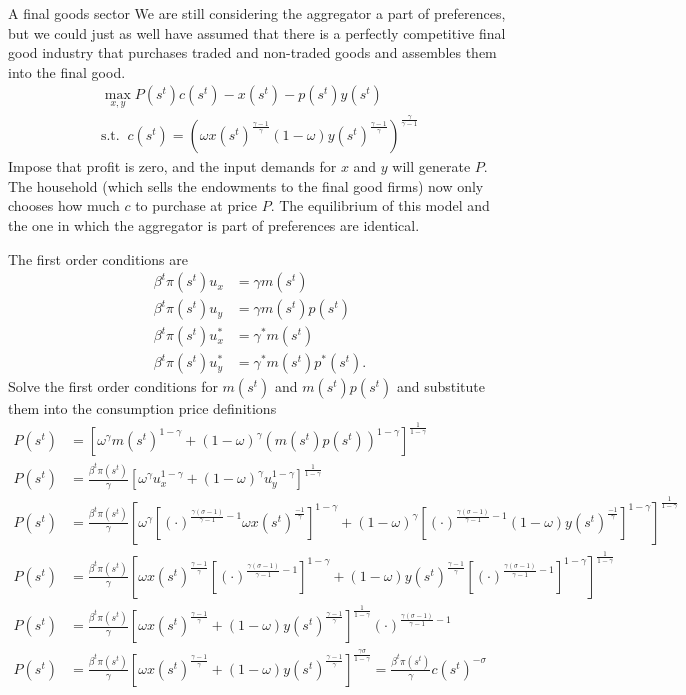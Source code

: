 \documentclass[11pt,pdftex,twoside,letterpaper]{exam}
\begin{document}
\begin{mybox}{A final goods sector}
We are still considering the aggregator a part of preferences, but we could just as well have assumed that there is a perfectly competitive final good industry that purchases traded and non-traded goods and assembles them into the final good.
\begin{align}
  \max_{x,y} P(s^t)c(s^t) - x(s^t) - p(s^t)y(s^t) \\
  \textrm{s.t.}\;\; c(s^t) = \left( \omega x(s^t)^\frac{\gamma-1}{\gamma} (1-\omega)y(s^t)^\frac{\gamma-1}{\gamma}\right)^\frac{\gamma}{\gamma-1}
\end{align}
Impose that profit is zero, and the input demands for $x$ and $y$ will generate $P$. The household (which sells the endowments to the final good firms) now only chooses how much $c$ to purchase at price $P$. The equilibrium of this model and the one in which the aggregator is part of preferences are identical.
\end{mybox}
The first order conditions are
\begin{align}
  \beta^t\pi(s^t)u_x&=\gamma m(s^t)\\
  \beta^t\pi(s^t)u_y&=\gamma m(s^t)p(s^t)\\
  \beta^t\pi(s^t)u_x^*&=\gamma^* m(s^t)\\
  \beta^t\pi(s^t)u_y^*&=\gamma^* m(s^t)p^*(s^t).
\end{align}
Solve the first order conditions for $m(s^t)$ and $m(s^t)p(s^t)$ and substitute them into the consumption price definitions
\begin{align}
  P(s^t) &= \left[\omega^\gamma m(s^t)^{1-\gamma} + (1-\omega)^\gamma \left(m(s^t)p(s^t)\right)^{1-\gamma}   \right]^\frac{1}{1-\gamma}\\
  P(s^t) &= \frac{\beta^t\pi(s^t)}{\gamma}\left[\omega^\gamma u_x^{1-\gamma} + (1-\omega)^\gamma u_y^{1-\gamma}   \right]^\frac{1}{1-\gamma}\\
  P(s^t) &= \frac{\beta^t\pi(s^t)}{\gamma}\left[\omega^\gamma \left[ (\cdot)^{\frac{\gamma(\sigma-1)}{\gamma-1}-1} \omega x(s^t)^\frac{-1}{\gamma} \right]^{1-\gamma} + (1-\omega)^\gamma \left[ (\cdot)^{\frac{\gamma(\sigma-1)}{\gamma-1}-1} (1-\omega) y(s^t)^\frac{-1}{\gamma} \right]^{1-\gamma}   \right]^\frac{1}{1-\gamma}\\
  P(s^t) &= \frac{\beta^t\pi(s^t)}{\gamma}\left[\omega x(s^t)^\frac{\gamma-1}{\gamma}\left[ (\cdot)^{\frac{\gamma(\sigma-1)}{\gamma-1}-1}   \right]^{1-\gamma} + (1-\omega)y(s^t)^\frac{\gamma-1}{\gamma} \left[ (\cdot)^{\frac{\gamma(\sigma-1)}{\gamma-1}-1}   \right]^{1-\gamma}   \right]^\frac{1}{1-\gamma}\\
  P(s^t) &= \frac{\beta^t\pi(s^t)}{\gamma}\left[\omega x(s^t)^\frac{\gamma-1}{\gamma}+ (1-\omega)y(s^t)^\frac{\gamma-1}{\gamma}    \right]^\frac{1}{1-\gamma} (\cdot)^{\frac{\gamma(\sigma-1)}{\gamma-1}-1}\\
  P(s^t) &= \frac{\beta^t\pi(s^t)}{\gamma}\left[\omega x(s^t)^\frac{\gamma-1}{\gamma}+ (1-\omega)y(s^t)^\frac{\gamma-1}{\gamma}    \right]^\frac{\gamma\sigma}{1-\gamma} = \frac{\beta^t\pi(s^t)}{\gamma}c(s^t)^{-\sigma}
\end{align}
\end{document}

